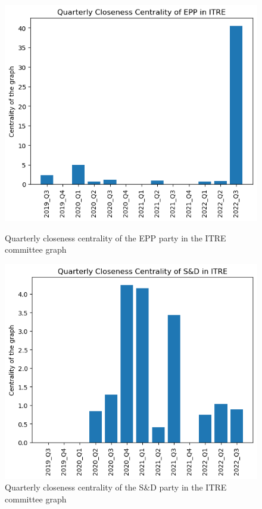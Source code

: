 \documentclass[lettersize,journal]{IEEEtran}
\begin{document}
\begin{figure}[h]
  \centering
  \begin{minipage}[b]{0.23\textwidth}
    \includegraphics[width=\textwidth]{EPP_ITRE_Q_closeness.png}
    \caption{Quarterly closeness centrality of the EPP party in the ITRE committee graph}
    \label{EPP_ITRE_Q_closeness}
  \end{minipage}
  \hfill
  \begin{minipage}[b]{0.23\textwidth}
    \includegraphics[width=\textwidth]{S&D_ITRE_Q_closeness.png}
    \caption{Quarterly closeness centrality of the S\&D party in the ITRE committee graph}
    \label{S&D_ITRE_Q_closeness}
  \end{minipage}
\end{figure}
\end{document}
